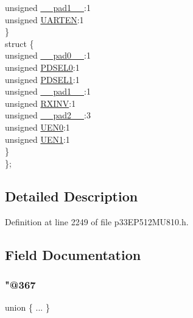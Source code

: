 \begin{DoxyCompactItemize}
\begin{tabbing}
\>\>unsigned \hyperlink{structtag_u4_m_o_d_e_b_i_t_s_acaf2d0924a107ec6e8d2e31febaf66f9}{\_\_pad1\_\_}:1\\
\>\>unsigned \hyperlink{structtag_u4_m_o_d_e_b_i_t_s_a71c27a2a2a21a1e41f5d969caaedc4ce}{UARTEN}:1\\
\>\} \\
\>struct \{\\
\>\>unsigned \hyperlink{structtag_u4_m_o_d_e_b_i_t_s_adf71f3d8410c1f1dbbc96680a92c49af}{\_\_pad0\_\_}:1\\
\>\>unsigned \hyperlink{structtag_u4_m_o_d_e_b_i_t_s_a3b06981d12ef9472672b5afa3fcb1096}{PDSEL0}:1\\
\>\>unsigned \hyperlink{structtag_u4_m_o_d_e_b_i_t_s_abd9cead9920f08c4dffa97b0c9210cbc}{PDSEL1}:1\\
\>\>unsigned \hyperlink{structtag_u4_m_o_d_e_b_i_t_s_acaf2d0924a107ec6e8d2e31febaf66f9}{\_\_pad1\_\_}:1\\
\>\>unsigned \hyperlink{structtag_u4_m_o_d_e_b_i_t_s_a53e5f9028d2bcb77dfd7b2cdb49809fe}{RXINV}:1\\
\>\>unsigned \hyperlink{structtag_u4_m_o_d_e_b_i_t_s_a4d97cc5f7d51d22fc2bf3eab35c9cb7f}{\_\_pad2\_\_}:3\\
\>\>unsigned \hyperlink{structtag_u4_m_o_d_e_b_i_t_s_acdbd7f8b51f26e512915a94d8d8f6c0d}{UEN0}:1\\
\>\>unsigned \hyperlink{structtag_u4_m_o_d_e_b_i_t_s_ab3c4d77b59c26a79b60548ef7ea7fd38}{UEN1}:1\\
\>\} \\
\}; \\

\end{tabbing}\end{DoxyCompactItemize}


\subsection{Detailed Description}


Definition at line 2249 of file p33\+E\+P512\+M\+U810.\+h.



\subsection{Field Documentation}
\mbox{\label{structtag_u4_m_o_d_e_b_i_t_s_a79d1e54381049c13be6b8222b5631ccd}} 
\subsubsection{\texorpdfstring{"@367}{@367}}
{\footnotesize\ttfamily union \{ ... \} }

